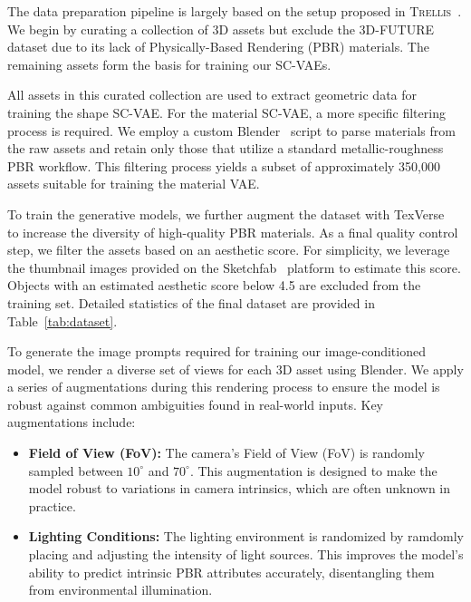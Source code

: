 \documentclass[10pt,twocolumn,letterpaper]{article}
\begin{document}
The data preparation pipeline is largely based on the setup proposed in \textsc{Trellis}~\cite{xiang2025structured}. We begin by curating a collection of 3D assets but exclude the 3D-FUTURE~\cite{fu20213d} dataset due to its lack of Physically-Based Rendering (PBR) materials. The remaining assets form the basis for training our SC-VAEs.

All assets in this curated collection are used to extract geometric data for training the shape SC-VAE. For the material SC-VAE, a more specific filtering process is required. We employ a custom Blender~\cite{blender} script to parse materials from the raw assets and retain only those that utilize a standard metallic-roughness PBR workflow. This filtering process yields a subset of approximately 350,000 assets suitable for training the material VAE.

To train the generative models, we further augment the dataset with TexVerse~\cite{zhang2025texverse} to increase the diversity of high-quality PBR materials. As a final quality control step, we filter the assets based on an aesthetic score. For simplicity, we leverage the thumbnail images provided on the Sketchfab~\cite{sketchfab2025} platform to estimate this score. Objects with an estimated aesthetic score below 4.5 are excluded from the training set. Detailed statistics of the final dataset are provided in Table~\ref{tab:dataset}.

To generate the image prompts required for training our image-conditioned model, we render a diverse set of views for each 3D asset using Blender. We apply a series of augmentations during this rendering process to ensure the model is robust against common ambiguities found in real-world inputs. Key augmentations include:
\begin{itemize}
    \item \textbf{Field of View (FoV):} The camera's Field of View (FoV) is randomly sampled between $10^\circ$ and $70^\circ$. This augmentation is designed to make the model robust to variations in camera intrinsics, which are often unknown in practice.
    
    \item \textbf{Lighting Conditions:} The lighting environment is randomized by ramdomly placing and adjusting the intensity of light sources. This improves the model's ability to predict intrinsic PBR attributes accurately, disentangling them from environmental illumination.
\end{itemize}
\end{document}
